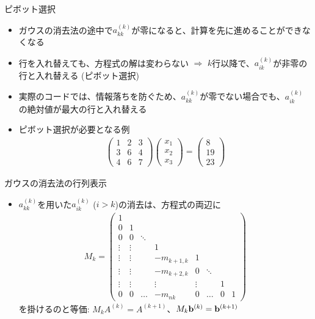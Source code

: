 \begin{frame}[t,fragile]{ピボット選択}
  \begin{itemize}
    \setlength{\itemsep}{1em}
  \item ガウスの消去法の途中で$a_{kk}^{(k)}$が零になると、計算を先に進めることができなくなる
  \item 行を入れ替えても、方程式の解は変わらない $\Rightarrow$ $k$行以降で、$a_{ik}^{(k)}$が非零の行と入れ替える (ピボット選択)
  \item 実際のコードでは、情報落ちを防ぐため、$a_{kk}^{(k)}$が零でない場合でも、$a_{ik}^{(k)}$の絶対値が最大の行と入れ替える
  \item ピボット選択が必要となる例
    \begin{align*}
      \begin{pmatrix} 1 & 2 & 3 \\ 3 & 6 & 4 \\ 4 & 6 & 7 \end{pmatrix} \begin{pmatrix} x_1 \\ x_2 \\ x_3 \end{pmatrix} = \begin{pmatrix} 8 \\ 19 \\ 23 \end{pmatrix}
    \end{align*}
  \end{itemize}
\end{frame}

\begin{frame}[t,fragile]{ガウスの消去法の行列表示}
  \begin{itemize}
    \setlength{\itemsep}{1em}
  \item $a_{kk}^{(k)}$を用いた$a_{ik}^{(k)}$ ($i>k$)の消去は、方程式の両辺に
    \begin{align*}
      M_k = 
      \begin{pmatrix}
        1 & \\
        0 & 1 \\
        0 & 0 & \ddots \\
        \vdots & \vdots & & 1 \\
        \vdots & \vdots & & -m_{k+1,k} & 1 & \\
        \vdots & \vdots & & -m_{k+2,k} & 0 & \ddots \\
        \vdots & \vdots & & \vdots & \vdots & & 1 & \\
        0 & 0 & \hdots & -m_{nk} & 0 & \hdots & 0 & 1
      \end{pmatrix}
    \end{align*}
    を掛けるのと等価: $M_k A^{(k)} = A^{(k+1)}$、$M_k {\bf b}^{(k)} = {\bf b}^{(k+1)}$
  \end{itemize}
\end{frame}

